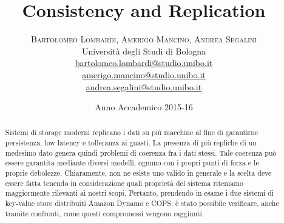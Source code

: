 \documentclass[twoside]{article}
\title{\vspace{-15mm}\fontsize{24pt}{10pt}\selectfont\textbf{Consistency and Replication}} %
\author{
\large
\textsc{Bartolomeo Lombardi, Amerigo Mancino, Andrea Segalini}\\[2mm] %
\normalsize Università degli Studi di Bologna %
\vspace{5mm} \\
\normalsize \href{mailto:bartolomeo.lombardi@studio.unibo.it}{bartolomeo.lombardi@studio.unibo.it}\\
\normalsize \href{mailto:amerigo.mancino@studio.unibo.it}{amerigo.mancino@studio.unibo.it}\\
\normalsize \href{mailto:andrea.segalini@studio.unibo.it}{andrea.segalini@studio.unibo.it}
\vspace{-5mm}
}
\date{Anno Accademico 2015-16}
\begin{document}
\maketitle 


\begin{abstract}
\noindent
Sistemi di storage moderni replicano i dati su più macchine al fine di garantirne persistenza, low latency e tolleranza ai guasti. La presenza di più repliche di un medesimo dato genera quindi problemi di coerenza fra i dati stessi. Tale coerenza può essere garantita mediante diversi modelli, ognuno con i propri punti di forza e le proprie debolezze. Chiaramente, non ne esiste uno valido in generale e la scelta deve essere fatta tenendo in considerazione quali proprietà del sistema riteniamo maggiormente rilevanti ai nostri scopi. Pertanto, prendendo in esame i due sistemi di key-value store distribuiti Amazon Dynamo e COPS, è stato possibile verificare, anche tramite confronti, come questi compromessi vengono raggiunti.
\end{abstract}


\vspace{15mm} %

\end{document}
